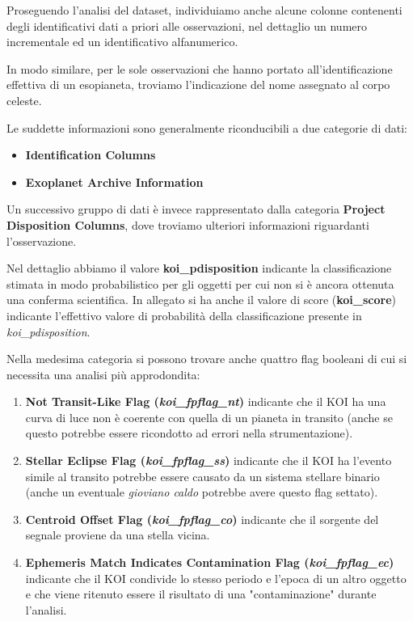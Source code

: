 Proseguendo l'analisi del dataset, individuiamo anche alcune colonne 
contenenti degli identificativi dati a priori alle osservazioni, nel dettaglio 
un numero incrementale ed un identificativo alfanumerico.

In modo similare, per le sole osservazioni che hanno portato all'identificazione 
effettiva di un esopianeta, troviamo l'indicazione del nome assegnato al corpo celeste. 

Le suddette informazioni sono generalmente riconducibili a due categorie di dati:
\begin{itemize}
    \item \textbf{Identification Columns}
    \item \textbf{Exoplanet Archive Information}
\end{itemize}

Un successivo gruppo di dati è invece rappresentato dalla categoria 
\textbf{Project Disposition Columns}, dove troviamo ulteriori informazioni 
riguardanti l'osservazione.

Nel dettaglio abbiamo il valore \textbf{koi\_pdisposition} indicante la 
classificazione stimata in modo probabilistico per gli oggetti per cui 
non si è ancora ottenuta una conferma scientifica.
In allegato si ha anche il valore di score (\textbf{koi\_score})
indicante l'effettivo valore di probabilità della classificazione presente in
\textit{koi\_pdisposition}.

Nella medesima categoria si possono trovare anche quattro flag booleani di cui 
si necessita una analisi più approdondita:
\begin{enumerate}
    \item \textbf{Not Transit-Like Flag (\textit{koi\_fpflag\_nt})} indicante
    che il KOI ha una curva di luce non è coerente con quella di un pianeta in 
    transito (anche se questo potrebbe essere ricondotto ad errori nella 
    strumentazione).
    \item \textbf{Stellar Eclipse Flag (\textit{koi\_fpflag\_ss})} indicante
    che il KOI ha l'evento simile al transito potrebbe essere causato da un 
    sistema stellare binario (anche un eventuale \textit{gioviano caldo} 
    potrebbe avere questo flag settato).
    \item \textbf{Centroid Offset Flag (\textit{koi\_fpflag\_co})} indicante
    che il sorgente del segnale proviene da una stella vicina.
    \item \textbf{Ephemeris Match Indicates Contamination Flag
    (\textit{koi\_fpflag\_ec})} indicante che il KOI condivide lo stesso periodo
    e l'epoca di un altro oggetto e che viene ritenuto essere il risultato di
    una "contaminazione" durante l'analisi.
\end{enumerate}

